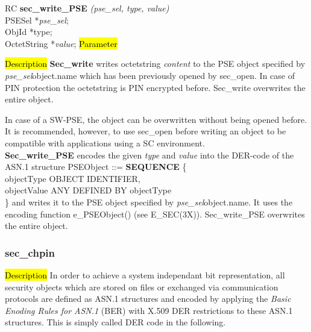 RC {\bf sec\_write\_PSE} {\em (pse\_sel, type, value)} \\
PSESel *{\em pse\_sel}; \\
ObjId *type; \\
OctetString *{\em value};
\hl{Parameter}




\hl{Description}
{\bf Sec\_write} writes octetstring {\em content} to the PSE object specified by 
{\em pse\_sel}\pf object.name which has been previously opened by sec\_open. 
In case of PIN protection the octetstring is
PIN encrypted before. Sec\_write overwrites the entire object. 

In case of a SW-PSE, the object can be overwritten without being opened before. It is recommended, however,
to use sec\_open before writing an object to be compatible with applications using
a SC environment. \\ [1em]
{\bf Sec\_write\_PSE} encodes the given {\em type} and {\em value} into the DER-code of the 
ASN.1 structure
\bc
{\small
\bvtab
PSEObject ::= \3 {\bf SEQUENCE} \{ \\
\5 objectType \3 OBJECT IDENTIFIER, \\
\5 objectValue \3 ANY DEFINED BY objectType \\
\3 \}
\evtab
}
\ec
and writes it to the PSE object specified by {\em pse\_sel}\pf object.name. It uses the encoding function
e\_PSEObject() (see E\_SEC(3X)). Sec\_write\_PSE overwrites the entire object.

\subsubsection{sec\_chpin}
\label{intro4}
\hl{Description}
In order to achieve a system independant bit representation, all security 
objects 
which are stored on files or exchanged via communication protocols are 
defined as ASN.1 structures and encoded by applying
the {\em Basic Enoding Rules for ASN.1} (BER) with X.509 DER restrictions 
to these 
ASN.1 structures. This is simply called DER code in the following. 

